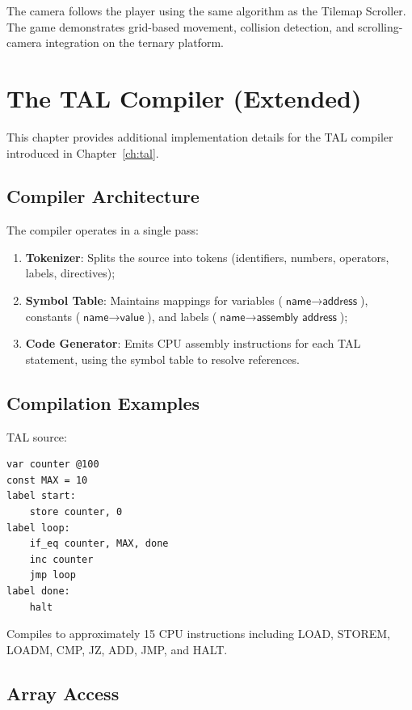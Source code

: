 \documentclass[12pt,a4paper,twoside]{book}
\theoremstyle{trinarytheorem}
\theoremstyle{trinarydefinition}
\newcommand{\code}[1]{\textsf{#1}}
\begin{document}
The camera follows the player using the same algorithm as the Tilemap
Scroller. The game demonstrates grid-based movement, collision
detection, and scrolling-camera integration on the ternary platform.

\chapter{The TAL Compiler (Extended)}
\label{ch:tal-ext}

This chapter provides additional implementation details for the TAL compiler introduced
in Chapter~\ref{ch:tal}.

\section{Compiler Architecture}

The compiler operates in a single pass:
\begin{enumerate}
    \item \textbf{Tokenizer}: Splits the source into tokens (identifiers, numbers,
          operators, labels, directives);
    \item \textbf{Symbol Table}: Maintains mappings for variables ($\code{name}
          \rightarrow \code{address}$), constants ($\code{name} \rightarrow
          \code{value}$), and labels ($\code{name} \rightarrow \code{assembly
          address}$);
    \item \textbf{Code Generator}: Emits CPU assembly instructions for each TAL
          statement, using the symbol table to resolve references.
\end{enumerate}

\section{Compilation Examples}

TAL source:
\begin{verbatim}
var counter @100
const MAX = 10
label start:
    store counter, 0
label loop:
    if_eq counter, MAX, done
    inc counter
    jmp loop
label done:
    halt
\end{verbatim}

Compiles to approximately 15 CPU instructions including LOAD, STOREM, LOADM, CMP, JZ,
ADD, JMP, and HALT.

\section{Array Access}
\end{document}
